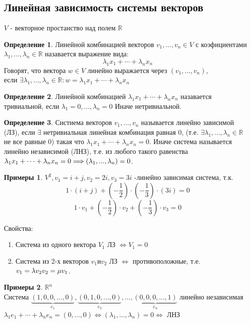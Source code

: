 \documentclass[a4paper, 12pt]{article}
\newcommand{\R}{\mathbb R}
\theoremstyle{definition}
\newtheorem*{definition}{Определение}
\newtheorem*{example}{Примеры}
\begin{document}
  \subsection{Линейная зависимость системы векторов}
  $V$ - векторное простанство над полем $\R$
  \begin{definition}
    Линейной комбинацией векторов $v_1,...,v_n \in V$ с коэфициентами $\lambda_1,...,\lambda_n \in \R$ назавается выражение вида: 
    $$\lambda_1 x_1 + \cdots + \lambda_n x_n$$ 
    Говорят, что вектора $w \in V$ линейно выражается через $(v_1,...,v_n)$, \\ если $\exists \lambda_1,...,\lambda_n \in \R: w = \lambda_1 x_1 + \cdots + \lambda_n x_n$   
  \end{definition}   
  \begin{definition}
    Линейной комбинацией $\lambda_1 x_1 + \cdots + \lambda_n x_n$ назавается тривиальной, если $\lambda_1 = 0,...,\lambda_n = 0$ Иначе нетривиальной.
  \end{definition} 
  \begin{definition}
    Систиема векторов $v_1,...,v_n$ называется линейно зависимой (ЛЗ), если $\exists$ нетривиальная линейная комбинация равная 0, (т.е. $\exists \lambda_1,...,\lambda_n \in \R$ не все равные 0) такая что $\lambda_1 x_1 + \cdots + \lambda_n x_n = 0$. Иначе система называется линейно независимой (ЛНЗ), т.е. из любого такого равенства $\lambda_1 x_1 + \cdots + \lambda_n x_n = 0 \\ \Longrightarrow (\lambda_1,...,\lambda_n) = 0$.
  \end{definition}
  \begin{example}
    $V^2, v_1 = i + j, v_2 = 2i, v_3 = 3i$ -линейно зависимая система, т.к. $$1 \cdot (i + j) + (- \frac{1}{2}) \cdot (-\frac{1}{3}) \cdot (3i) = 0$$ $$1 \cdot v_1 + (-\frac{1}{2}) \cdot v_2 + (-\frac{1}{3}) \cdot v_3 = 0$$  
  \end{example}  
  Свойства: 
  \begin{enumerate}
    \item Система из одного вектора $V_1$ ЛЗ $\Longleftrightarrow V_1 = 0$  
    \item Система из 2-х векторов $v_1 \text{и} v_2$ ЛЗ $\Longleftrightarrow$ противоположные, т.е. $v_1 = \lambda v_2 \\ v_2 = \mu v_1$. 
  \end{enumerate}
  \begin{example}
    $\R^n$ \\
    Система $\underbrace{(1,0,0,...,0)}_{e_1} , \underbrace{(0,1,0,...,0)}_{e_2},...,\underbrace{(0,0,0,...,1)}_{e_n}$ линейно независимая \\
    $\lambda_1 e_1 + \cdots + \lambda_n e_n = (0,...,0) \Longleftrightarrow (\lambda_1,...,\lambda_n) = 0 \Longleftrightarrow $ ЛНЗ 
  \end{example}
\end{document}
